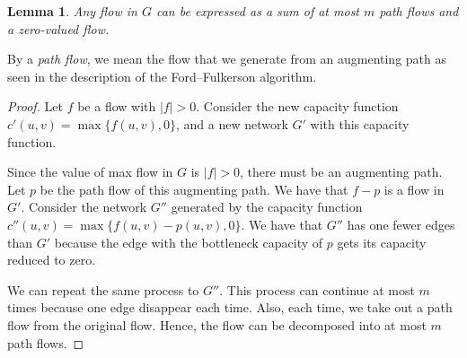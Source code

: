 \documentclass[10pt]{article}
\newtheorem{lemma}{Lemma}[section]
\begin{document}
\begin{itemize}
          \begin{lemma} \label{flow-decomposition}
            Any flow in $G$ can be expressed as a sum of 
            at most $m$ \emph{path flows} and a zero-valued flow.
          \end{lemma}

          By a \emph{path flow}, we mean the flow that we generate
          from an augmenting path as seen in the description of
          the Ford--Fulkerson algorithm.

          \begin{proof}
            Let $f$ be a flow with $|f| > 0$. 
            Consider the new capacity function
            $c'(u,v) = \max\{ f(u,v), 0 \}$, and a new network
            $G'$ with this capacity function.

            Since the value of max flow in $G$ is $|f| > 0$,
            there must be an augmenting path. Let $p$
            be the path flow of this augmenting path.
            We have that $f - p$ is a flow in $G'$.
            Consider the network $G''$ generated by the 
            capacity function $c''(u,v) = \max \{ f(u,v) - p(u,v), 0 \}.$
            We have that $G''$ has one fewer edges than $G'$
            because the edge with the bottleneck capacity
            of $p$ gets its capacity reduced to zero.

            We can repeat the same process to $G''$.
            This process can continue at most $m$ times
            because one edge disappear each time.
            Also, each time, we take out a path flow
            from the original flow.
            Hence, the flow can be decomposed into
            at most $m$ path flows.
          \end{proof}
    \end{itemize}
        
\end{document}
